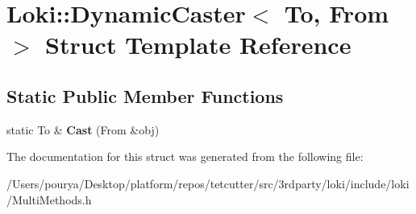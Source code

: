 \hypertarget{structLoki_1_1DynamicCaster}{}\section{Loki\+:\+:Dynamic\+Caster$<$ To, From $>$ Struct Template Reference}
\label{structLoki_1_1DynamicCaster}
\subsection*{Static Public Member Functions}
\begin{DoxyCompactItemize}
\item 
\hypertarget{structLoki_1_1DynamicCaster_a96e880b415072a44dfb26188231febfd}{}static To \& {\bfseries Cast} (From \&obj)\label{structLoki_1_1DynamicCaster_a96e880b415072a44dfb26188231febfd}

\end{DoxyCompactItemize}


The documentation for this struct was generated from the following file\+:\begin{DoxyCompactItemize}
\item 
/\+Users/pourya/\+Desktop/platform/repos/tetcutter/src/3rdparty/loki/include/loki/Multi\+Methods.\+h\end{DoxyCompactItemize}
